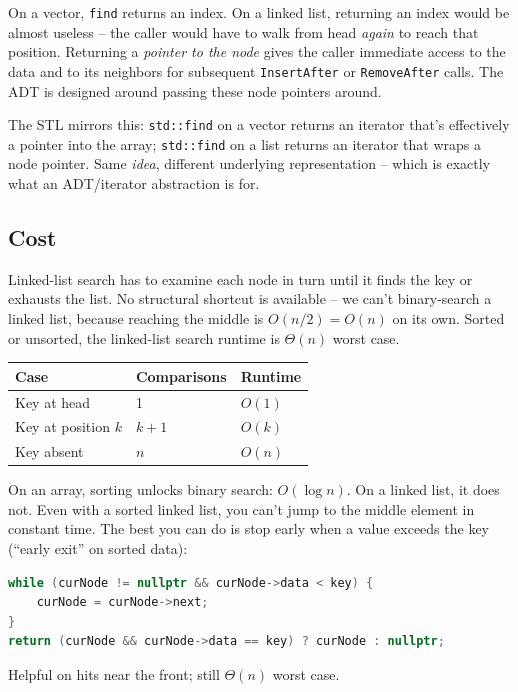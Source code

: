 \documentclass[11pt]{article}
\begin{document}
\begin{warnbox}
On a vector, \texttt{find} returns an index. On a linked list,
returning an index would be almost useless -- the caller would have
to walk from head \emph{again} to reach that position. Returning a
\emph{pointer to the node} gives the caller immediate access to the
data and to its neighbors for subsequent \texttt{InsertAfter} or
\texttt{RemoveAfter} calls. The ADT is designed around passing
these node pointers around.

The STL mirrors this: \texttt{std::find} on a vector returns an
iterator that's effectively a pointer into the array;
\texttt{std::find} on a list returns an iterator that wraps a node
pointer. Same \emph{idea}, different underlying representation --
which is exactly what an ADT/iterator abstraction is for.
\end{warnbox}

\subsection{Cost}

\begin{ideabox}[$O(n)$, always]
Linked-list search has to examine each node in turn until it finds
the key or exhausts the list. No structural shortcut is available
-- we can't binary-search a linked list, because reaching the
middle is $O(n/2) = O(n)$ on its own. Sorted or unsorted, the
linked-list search runtime is $\Theta(n)$ worst case.
\end{ideabox}

\begin{center}
\footnotesize
\renewcommand{\arraystretch}{1.25}
\begin{tabular}{@{}lll@{}}
\hline
\textbf{Case}    & \textbf{Comparisons} & \textbf{Runtime} \\
\hline
Key at head       & 1                   & $O(1)$ \\
Key at position $k$ & $k + 1$           & $O(k)$ \\
Key absent         & $n$                & $O(n)$ \\
\hline
\end{tabular}
\end{center}

\begin{warnbox}
On an array, sorting unlocks binary search: $O(\log n)$. On a
linked list, it does not. Even with a sorted linked list, you
can't jump to the middle element in constant time. The best you
can do is stop early when a value exceeds the key (``early exit''
on sorted data):
\begin{lstlisting}[basicstyle=\ttfamily\small,frame=single,language=C++]
while (curNode != nullptr && curNode->data < key) {
    curNode = curNode->next;
}
return (curNode && curNode->data == key) ? curNode : nullptr;
\end{lstlisting}
Helpful on hits near the front; still $\Theta(n)$ worst case.
\end{warnbox}
\end{document}
